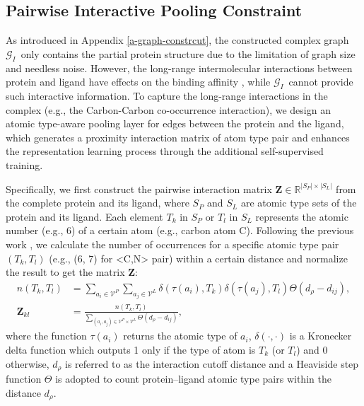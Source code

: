 \documentclass[sigconf]{acmart}
\newcommand{\graph}{\ensuremath{\mathcal{G}_I}}
\newcommand{\proteinV}{\ensuremath{\mathcal{V}^P}}
\newcommand{\ligandV}{\ensuremath{\mathcal{V}^L}}
\begin{document}
\subsection{Pairwise Interactive Pooling Constraint}
As introduced in Appendix \ref{a-graph-constrcut}, the constructed complex graph \graph \ only contains the partial protein structure due to the limitation of graph size and needless noise. However, the long-range intermolecular interactions between protein and ligand have effects on the binding affinity \cite{ballester2010machine, leckband1992long}, while \graph \ cannot provide such interactive information. To capture the long-range interactions in the complex (e.g., the Carbon-Carbon co-occurrence interaction), we design an atomic type-aware pooling layer for edges between the protein and the ligand, which generates a proximity interaction matrix of atom type pair and enhances the representation learning process through the additional self-supervised training. 

Specifically, we first construct the pairwise interaction matrix $\bm{Z} \in \mathbb{R}^{|S_P| \times |S_L|}$ from the complete protein and its ligand, where $S_P$ and $S_L$ are atomic type sets of the protein and its ligand. Each element $T_k$ in $S_P$ or $T_l$ in $S_L$ represents the atomic number (e.g., 6) of a certain atom (e.g., carbon atom C). Following the previous work \cite{ballester2010machine}, we calculate the number of occurrences for a specific atomic type pair $(T_k,T_l)$ (e.g., (6, 7) for <C,N> pair) within a certain distance and normalize the result to get the matrix $\bm{Z}$:
\begin{align}
\label{eq-im1}
    n(T_k, T_l) &= \sum_{a_i \in \proteinV}\sum_{a_j \in \ligandV}\delta(\tau(a_i), T_k) \delta(\tau(a_j),T_l) \Theta(d_{\rho} - d_{ij}),
    \\
\label{eq-im2}
    \bm{Z}_{kl} &= \frac{n(T_k, T_l)}{\sum_{(a_i,a_j) \in \proteinV \times \ligandV}\Theta(d_{\rho} - d_{ij})},
\end{align}
where the function $\tau(a_i)$ returns the atomic type of $a_i$, $\delta(\cdot, \cdot)$ is a Kronecker delta function which outputs 1 only if the type of atom is $T_k$ (or $T_l$) and 0 otherwise, $d_{\rho}$ is referred to as the interaction cutoff distance and a Heaviside step function $\Theta$ is adopted to count protein–ligand atomic type pairs within the distance $d_{\rho}$. 
\end{document}
